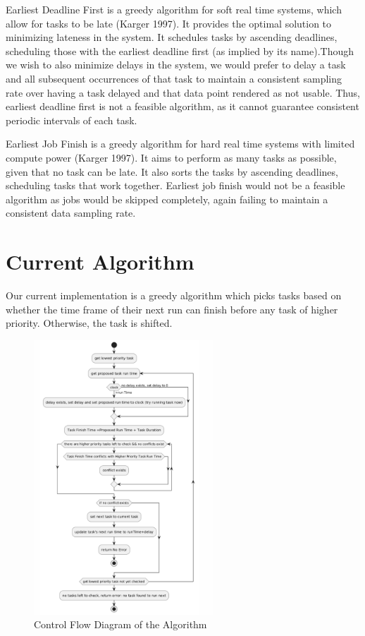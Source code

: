\documentclass{article}
\begin{document}
Earliest Deadline First is a greedy algorithm for soft real time systems, which allow for tasks to be late (Karger 1997). It provides the optimal solution to minimizing lateness in the system. It schedules tasks by ascending deadlines, scheduling those with the earliest deadline first (as implied by its name).Though we wish to also minimize delays in the system, we would prefer to delay a task and all subsequent occurrences of that task to maintain a consistent sampling rate over having a task delayed and that data point rendered as not usable. Thus, earliest deadline first is not a feasible algorithm, as it cannot guarantee consistent periodic intervals of each task. \newline

Earliest Job Finish is a greedy algorithm for hard real time systems with limited compute power (Karger 1997). It aims to perform as many tasks as possible, given that no task can be late. It also sorts the tasks by ascending deadlines, scheduling tasks that work together. Earliest job finish would not be a feasible algorithm as jobs would be skipped completely, again failing to maintain a consistent data sampling rate.  \newline

\section{Current Algorithm}

Our current implementation is a greedy algorithm which picks tasks based on whether the time frame of their next run can finish before any task of higher priority. Otherwise, the task is shifted. 

\begin{figure}[h]
    \centering
    \includegraphics[width=0.6\textwidth]{control_flow.png}
    \caption{Control Flow Diagram of the Algorithm}
    \label{fig:example}
\end{figure}
\end{document}
